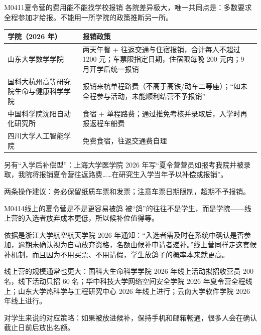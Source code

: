 \begin{qa}{M0411}{夏令营的费用能不能找学校报销}
各院差异极大，唯一共同点是：多数要求全程参加才给报。不能用一所学院的政策推断另一所。

\par\vspace{2pt}\nobreak\begin{center}\footnotesize
\begin{tabularx}{\textwidth}{>{\raggedright\arraybackslash}X>{\raggedright\arraybackslash}X}
\toprule
\textbf{学院（2026 年）} & \textbf{报销政策} \\ \midrule
山东大学数学学院 & 两天午餐 + 往返交通与住宿报销，合计每人不超过 1200 元；车票限指定日期，住宿限每晚 200 元内；9 月开学后统一报销 \\
国科大杭州高等研究院生命与健康科学学院 & 报销来杭单程路费（不高于高铁/动车二等座）；“如未全程参与活动，未能顺利结营不予报销” \\
中国科学院沈阳自动化研究所 & 食宿 + 单程路费；通过推免考核并录取后，入学时再报返程车船费 \\
四川大学人工智能学院 & 免费食宿，往返交通费自理 \\
\bottomrule
\end{tabularx}
\end{center}\vspace{2pt}\par

另有“入学后补偿型”：上海大学医学院 2026 年写“夏令营营员如报考我院并被录取，我院将报销夏令营往返路费……在研究生入学当年予以补偿或报销”。

两条操作建议：务必保留纸质车票和发票；注意车票日期限制，超期不予报销。
\end{qa}

\begin{qa}{M0414}{线上的夏令营是不是更容易被鸽}
被“鸽”的往往不是学生，而是学院——线上营的入选者放弃成本更低，所以候补位值得等。

依据是浙江大学航空航天学院 2026 年通知：“入选者需及时在系统中确认是否参加，逾期未确认视为自动放弃资格，名额由候补申请者递补。”线上营同样走这套候补机制，而且因为不用买票、不用请假，学生放鸽子的概率本来就更高。

线上营的规模通常也更大：国科大生命科学学院 2026 年线上活动拟招收营员 200 名，线下活动只招 60 名；华中科技大学网络空间安全学院 2026 年夏令营全程线上；山东大学热科学与工程研究中心 2026 年线上进行；云南大学软件学院 2026 年线上进行。

对学生来说的对应策略：如果被放进候补，保持手机和邮箱畅通，很多人会在确认截止日前后放出名额。
\end{qa}


